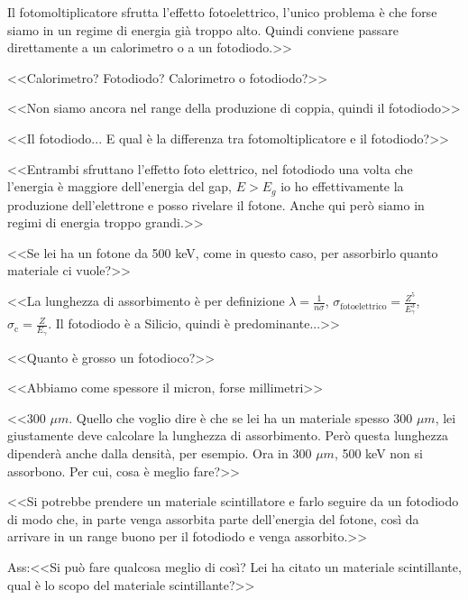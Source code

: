 \documentclass[../main.tex]{subfiles}
\begin{document}
\begin{enumerate}
{\begin{flushright}
        Il fotomoltiplicatore sfrutta l'effetto fotoelettrico, l'unico problema è che forse siamo in un regime di energia già troppo alto. Quindi conviene passare direttamente a un calorimetro o a un fotodiodo.>>
        \end{flushright}
        <<Calorimetro? Fotodiodo? Calorimetro o fotodiodo?>>
        \begin{flushright}
        <<Non siamo ancora nel range della produzione di coppia, quindi il fotodiodo>>
        \end{flushright}
        <<Il fotodiodo... E qual è la differenza tra fotomoltiplicatore e il fotodiodo?>>
        \begin{flushright}
        <<Entrambi sfruttano l'effetto foto elettrico, nel fotodiodo una volta che l'energia è maggiore dell'energia del gap, $E>E_g$ io ho effettivamente la produzione dell'elettrone e posso rivelare il fotone. Anche qui però siamo in regimi di energia troppo grandi.>>
        \end{flushright}
        <<Se lei ha un fotone da 500 keV, come in questo caso, per assorbirlo quanto materiale ci vuole?>>
        \begin{flushright}
        <<La lunghezza di assorbimento è per definizione $\lambda=\frac{1}{n\sigma}$, $\sigma_{\textrm{fotoelettrico}}= \frac{Z^5}{E_{\gamma}^3}$, $\sigma_{\textrm{c}}=\frac{Z}{E_\gamma}$. Il fotodiodo è a Silicio, quindi è predominante...>>
        \end{flushright}
        <<Quanto è grosso un fotodioco?>>
        \begin{flushright}
        <<Abbiamo come spessore il micron, forse millimetri>>
        \end{flushright}
        <<300 $\mu m$. Quello che voglio dire è che se lei ha un materiale spesso 300 $\mu m$, lei giustamente deve calcolare la lunghezza di assorbimento. Però questa lunghezza dipenderà anche dalla densità, per esempio. Ora in 300 $\mu m$, 500 keV non si assorbono. Per cui, cosa è meglio fare?>>
        \begin{flushright}
        <<Si potrebbe prendere un materiale scintillatore e farlo seguire da un fotodiodo di modo che, in parte venga assorbita parte dell'energia del fotone, così da arrivare in un range buono per il fotodiodo e venga assorbito.>>
        \end{flushright}
        Ass:<<Si può fare qualcosa meglio di così? Lei ha citato un materiale scintillante, qual è lo scopo del materiale scintillante?>>
        \begin{flushright}

\end{flushright}}
\end{enumerate}
\end{document}
